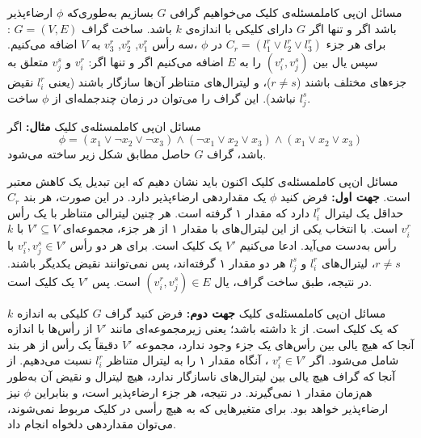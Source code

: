 \begin{itemframe-s}{مسائل ان‌پی کامل}{مسئله‌ی کلیک}
\itm
می‌خواهیم گرافی $G$ بسازیم به‌طوری‌که $\phi$ ارضاء‌پذیر باشد اگر و تنها اگر $G$ دارای کلیکی با اندازه‌ی $k$ باشد.
\itm
ساخت گراف
$G= (V, E)$
: برای هر جزء
$C_r = (l^r_1 \vee l^r_2 \vee l^r_3)$
در
$\phi$
،سه رأس
$v^r_1$, $v^r_2$, $v^r_3$
به $V$ اضافه می‌کنیم.
\itm
سپس یال بین
$(v^r_i, v^s_j)$
را به $E$ اضافه می‌کنیم اگر و تنها اگر:
$v^r_i$
و
$v^s_j$
متعلق به جزءهای مختلف باشند ($r \neq s$)، و
لیترال‌های متناظر آن‌ها سازگار باشند (یعنی $l^r_i$ نقیض $l^s_j$ نباشد).
\itm
این گراف را می‌توان در زمان چندجمله‌ای از $\phi$ ساخت.
\end{itemframe-s}


\begin{itemframe-s}{مسائل ان‌پی کامل}{مسئله‌ی کلیک}
\itm
\textbf{مثال:}
اگر
$$
\phi = (x_1 \vee \lnot x_2 \vee \lnot x_3) \wedge (\lnot x_1 \vee x_2 \vee x_3) \wedge (x_1 \vee x_2 \vee x_3)
$$
باشد، گراف $G$ حاصل مطابق شکل زیر ساخته می‌شود.

\end{itemframe-s}


\begin{itemframe-s}{مسائل ان‌پی کامل}{مسئله‌ی کلیک}
\itm
اکنون باید نشان دهیم که این تبدیل یک کاهش معتبر است.
\itm
\textbf{جهت اول:}
فرض کنید $\phi$ یک مقداردهی ارضاء‌پذیر دارد.
در این صورت، هر بند $C_r$ حداقل یک لیترال
$l^r_i$
دارد که مقدار ۱ گرفته است.
هر چنین لیترالی متناظر با یک رأس $v^r_i$ است.
\itm
با انتخاب یکی از این لیترال‌های با مقدار ۱ از هر جزء، مجموعه‌ای
$V' \subseteq V$
 با $k$ رأس به‌دست می‌آید.
ادعا می‌کنیم $V'$ یک کلیک است.
\itm
برای هر دو رأس
$v^r_i, v^s_j \in V'$
 با
$r \neq s$،
لیترال‌های $l^r_i$ و $l^s_j$ هر دو مقدار ۱ گرفته‌اند،
پس نمی‌توانند نقیض یکدیگر باشند.
در نتیجه، طبق ساخت گراف، یال
$(v^r_i, v^s_j) \in E$
است.
پس $V'$ یک کلیک است.
\end{itemframe-s}


\begin{itemframe-s}{مسائل ان‌پی کامل}{مسئله‌ی کلیک}
\itm
\textbf{جهت دوم:}
فرض کنید گراف $G$ کلیکی به اندازه $k$ داشته باشد؛ یعنی زیرمجموعه‌ای مانند $V'$ از رأس‌ها با اندازه k که یک کلیک است.
\itm
از آنجا که هیچ یالی بین رأس‌های یک جزء وجود ندارد،
مجموعه $V'$ دقیقاً یک رأس از هر بند شامل می‌شود.
اگر
$v^r_i \in V'$
، آنگاه مقدار ۱ را به لیترال متناظر $l^r_i$ نسبت می‌دهیم.
\itm
از آنجا که گراف هیچ یالی بین لیترال‌های ناسازگار ندارد،
هیچ لیترال و نقیض آن به‌طور هم‌زمان مقدار ۱ نمی‌گیرند.
در نتیجه، هر جزء ارضاءپذیر است، و بنابراین $\phi$ نیز ارضاءپذیر خواهد بود.
\itm
برای متغیرهایی که به هیچ رأسی در کلیک مربوط نمی‌شوند، می‌توان مقداردهی دلخواه انجام داد.
\end{itemframe-s}



